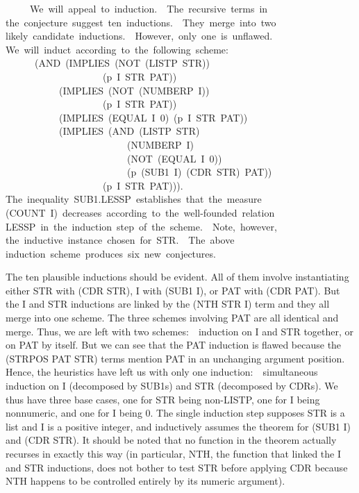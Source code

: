 \documentclass[11pt]{book}
\newenvironment{pubasis}{\begin{flushleft}\ttfamily\small}{\normalsize\rmfamily\end{flushleft}}
\begin{document}
\begin{pubasis}
~~~~~We~will~appeal~to~induction.~~The~recursive~terms~in\\
the~conjecture~suggest~ten~inductions.~~They~merge~into~two\\
likely~candidate~inductions.~~However,~only~one~is~unflawed.\\
We~will~induct~according~to~the~following~scheme:\\
~~~~~~(AND~(IMPLIES~(NOT~(LISTP~STR))\\
~~~~~~~~~~~~~~~~~~~~(p~I~STR~PAT))\\
~~~~~~~~~~~(IMPLIES~(NOT~(NUMBERP~I))\\
~~~~~~~~~~~~~~~~~~~~(p~I~STR~PAT))\\
~~~~~~~~~~~(IMPLIES~(EQUAL~I~0)~(p~I~STR~PAT))\\
~~~~~~~~~~~(IMPLIES~(AND~(LISTP~STR)\\
~~~~~~~~~~~~~~~~~~~~~~~~~(NUMBERP~I)\\
~~~~~~~~~~~~~~~~~~~~~~~~~(NOT~(EQUAL~I~0))\\
~~~~~~~~~~~~~~~~~~~~~~~~~(p~(SUB1~I)~(CDR~STR)~PAT))\\
~~~~~~~~~~~~~~~~~~~~(p~I~STR~PAT))).\\
The~inequality~SUB1.LESSP~establishes~that~the~measure\\
(COUNT~I)~decreases~according~to~the~well-founded~relation\\
LESSP~in~the~induction~step~of~the~scheme.~~Note,~however,\\
the~inductive~instance~chosen~for~STR.~~The~above\\
induction~scheme~produces~six~new~conjectures.\\
\end{pubasis}
The ten plausible inductions should be evident.  All of them involve
instantiating either STR with (CDR STR),
I with (SUB1 I), or PAT with (CDR PAT).  But the I and STR inductions
are linked by the (NTH STR I) term and they all merge into
one scheme.  The three schemes
involving PAT are all identical and merge.  Thus, we are left
with two schemes:~~induction on I and STR together, or on PAT by itself.  But we can see that
the PAT induction is flawed because the (STRPOS PAT STR) terms mention
PAT in an unchanging argument position.  Hence, the heuristics have left us
with only one induction:~~simultaneous induction on I (decomposed by SUB1s) and STR (decomposed
by CDRs).  We thus have three base cases, one for STR being non-LISTP, one for
I being nonnumeric, and one for I being 0.  The single induction step
supposes STR is a list and I is a positive integer, and inductively
assumes the theorem for (SUB1 I) and (CDR STR).  It should be noted that no function in the theorem actually
recurses in exactly this way (in particular, NTH, the function
that linked the I and STR inductions, does not bother to test STR
before applying CDR because NTH happens to be controlled entirely
by its numeric argument).
\end{document}

